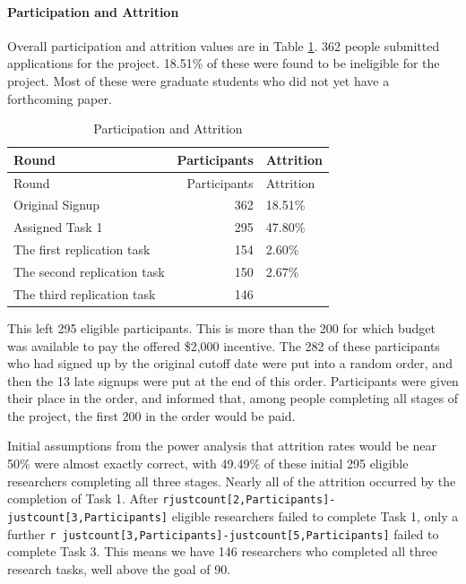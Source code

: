 \documentclass[
  letterpaper,
  DIV=11,
  numbers=noendperiod]{scrartcl}
\let\oldparagraph\paragraph
\renewcommand{\paragraph}[1]{\oldparagraph{#1}\mbox{}}
\begin{document}
\hypertarget{participation-and-attrition}{%
\paragraph{Participation and
Attrition}\label{participation-and-attrition}}

Overall participation and attrition values are in Table
\ref{tbl-attrition}. 362 people submitted applications for the project.
18.51\% of these were found to be ineligible for the project. Most of
these were graduate students who did not yet have a forthcoming paper.

\begin{longtable}[]{@{}lrl@{}}
\caption{Participation and
Attrition\label{tbl-attrition}}\tabularnewline
\toprule\noalign{}
Round & Participants & Attrition \\
\midrule\noalign{}
\endfirsthead
\toprule\noalign{}
Round & Participants & Attrition \\
\midrule\noalign{}
\endhead
\bottomrule\noalign{}
\endlastfoot
Original Signup & 362 & 18.51\% \\
Assigned Task 1 & 295 & 47.80\% \\
The first replication task & 154 & 2.60\% \\
The second replication task & 150 & 2.67\% \\
The third replication task & 146 & \\
\end{longtable}

This left 295 eligible participants. This is more than the 200 for which
budget was available to pay the offered \$2,000 incentive. The 282 of
these participants who had signed up by the original cutoff date were
put into a random order, and then the 13 late signups were put at the
end of this order. Participants were given their place in the order, and
informed that, among people completing all stages of the project, the
first 200 in the order would be paid.

Initial assumptions from the power analysis that attrition rates would
be near 50\% were almost exactly correct, with 49.49\% of these initial
295 eligible researchers completing all three stages. Nearly all of the
attrition occurred by the completion of Task 1. After
\texttt{r\textasciigrave{}\textasciigrave{}justcount{[}2,Participants{]}-\textasciigrave{}\textasciigrave{}justcount{[}3,Participants{]}}
eligible researchers failed to complete Task 1, only a further
\texttt{r\ justcount{[}3,Participants{]}-\textasciigrave{}\textasciigrave{}justcount{[}5,Participants{]}}
failed to complete Task 3. This means we have 146 researchers who
completed all three research tasks, well above the goal of 90.
\end{document}

